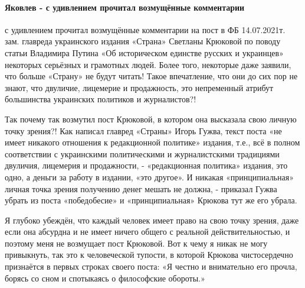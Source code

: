  
 
 
 
 
\paragraph{Яковлев - с удивлением прочитал возмущённые комментарии}

\begin{itemize}
 

с удивлением прочитал возмущённые комментарии на пост в ФБ 14.07.2021т. зам.
главреда украинского издания «Страна» Светланы Крюковой по поводу статьи
Владимира Путина «Об историческом единстве русских и украинцев» некоторых
серьёзных и грамотных людей. Более того, некоторые даже заявили, что больше
«Страну» не будут читать! Такое впечатление, что они до сих пор не знают, что
двуличие, лицемерие и продажность, это непременный атрибут большинства
украинских политиков и журналистов?!

Так почему так возмутил пост Крюковой, в котором она высказала свою личную
точку зрения?! Как написал главред «Страны» Игорь Гужва, текст поста «не имеет
никакого отношения к редакционной политике» издания, т.е., всё в полном
соответствии с украинскими политическими и журналистскими традициями двуличия,
лицемерия и продажности, - «редакционная политика» издания, это одно, а деньги
за работу в издании, «это другое». И никакая «принципиальная» личная точка
зрения получению денег мешать не должна, - приказал Гужва убрать из поста
«победобесие» и «принципиальная» Крюкова тут же его убрала.

Я глубоко убеждён, что каждый человек имеет право на свою точку зрения, даже
если она абсурдна и не имеет ничего общего с реальной действительностью, и
поэтому меня не возмущает пост Крюковой. Вот к чему я никак не могу привыкнуть,
так это к человеческой тупости, в которой Крюкова чистосердечно признаётся в
первых строках своего поста: «Я честно и внимательно его прочла, борясь со сном
и спотыкаясь о философские обороты.» 


\end{itemize}
